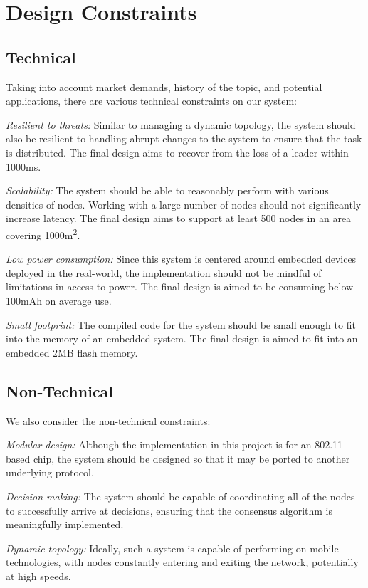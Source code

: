 \section{Design Constraints}
\subsection{Technical}

Taking into account market demands, history of the topic, and potential applications, there are various technical constraints on our system:

\textit{Resilient to threats:} Similar to managing a dynamic topology, the system should also be resilient to handling abrupt changes to the system to ensure that the task is distributed. The final design aims to recover from the loss of a leader within 1000\si{\ms}.

\textit{Scalability:} The system should be able to reasonably perform with various densities of nodes. Working with a large number of nodes should not significantly increase latency. The final design aims to support at least 500 nodes in an area covering 1000\si{m^2}.

\textit{Low power consumption:} Since this system is centered around embedded devices deployed in the real-world, the implementation should not be mindful of limitations in access to power. The final design is aimed to be consuming below 100\si{mAh} on average use.

\textit{Small footprint:} The compiled code for the system should be small enough to fit into the memory of an embedded system. The final design is aimed to fit into an embedded 2\si{MB} flash memory.

\subsection{Non-Technical}

We also consider the non-technical constraints:

\textit{Modular design:} Although the implementation in this project is for an 802.11 based chip, the system should be designed so that it may be ported to another underlying protocol.

\textit{Decision making:} The system should be capable of coordinating all of the nodes to successfully arrive at decisions, ensuring that the consensus algorithm is meaningfully implemented.

\textit{Dynamic topology:} Ideally, such a system is capable of performing on mobile technologies, with nodes constantly entering and exiting the network, potentially at high speeds.

